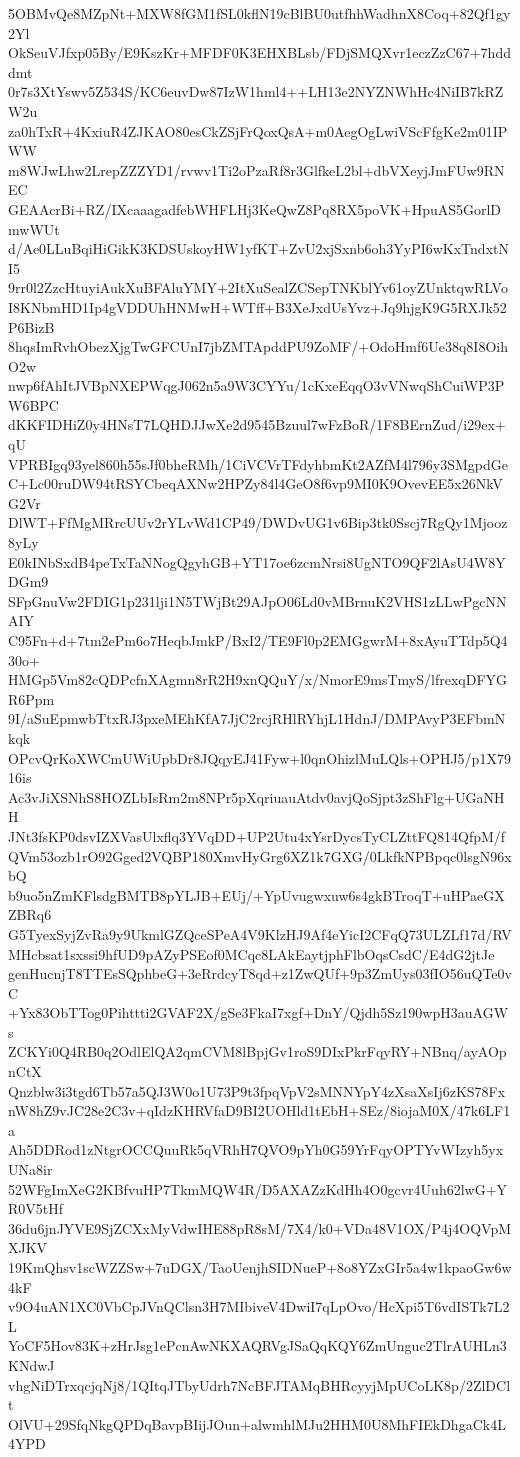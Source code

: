 5OBMvQe8MZpNt+MXW8fGM1fSL0kflN19cBlBU0utfhhWadhnX8Coq+82Qf1gy2Yl
OkSeuVJfxp05By/E9KszKr+MFDF0K3EHXBLsb/FDjSMQXvr1eczZzC67+7hdddmt
0r7s3XtYswv5Z534S/KC6euvDw87IzW1hml4++LH13e2NYZNWhHc4NiIB7kRZW2u
za0hTxR+4KxiuR4ZJKAO80esCkZSjFrQoxQsA+m0AegOgLwiVScFfgKe2m01IPWW
m8WJwLhw2LrepZZZYD1/rvwv1Ti2oPzaRf8r3GlfkeL2bl+dbVXeyjJmFUw9RNEC
GEAAcrBi+RZ/IXcaaagadfebWHFLHj3KeQwZ8Pq8RX5poVK+HpuAS5GorlDmwWUt
d/Ae0LLuBqiHiGikK3KDSUskoyHW1yfKT+ZvU2xjSxnb6oh3YyPI6wKxTndxtNI5
9rr0l2ZzcHtuyiAukXuBFAluYMY+2ItXuSealZCSepTNKblYv61oyZUnktqwRLVo
I8KNbmHD1Ip4gVDDUhHNMwH+WTff+B3XeJxdUsYvz+Jq9hjgK9G5RXJk52P6BizB
8hqsImRvhObezXjgTwGFCUnI7jbZMTApddPU9ZoMF/+OdoHmf6Ue38q8I8OihO2w
nwp6fAhItJVBpNXEPWqgJ062n5a9W3CYYu/1cKxeEqqO3vVNwqShCuiWP3PW6BPC
dKKFIDHiZ0y4HNsT7LQHDJJwXe2d9545Bzuul7wFzBoR/1F8BErnZud/i29ex+qU
VPRBIgq93yel860h55sJf0bheRMh/1CiVCVrTFdyhbmKt2AZfM4l796y3SMgpdGe
C+Lc00ruDW94tRSYCbeqAXNw2HPZy84l4GeO8f6vp9MI0K9OvevEE5x26NkVG2Vr
DlWT+FfMgMRrcUUv2rYLvWd1CP49/DWDvUG1v6Bip3tk0Sscj7RgQy1Mjooz8yLy
E0kINbSxdB4peTxTaNNogQgyhGB+YT17oe6zcmNrsi8UgNTO9QF2lAsU4W8YDGm9
SFpGnuVw2FDIG1p231lji1N5TWjBt29AJpO06Ld0vMBrnuK2VHS1zLLwPgcNNAIY
C95Fn+d+7tm2ePm6o7HeqbJmkP/BxI2/TE9Fl0p2EMGgwrM+8xAyuTTdp5Q430o+
HMGp5Vm82cQDPcfnXAgmn8rR2H9xnQQuY/x/NmorE9msTmyS/lfrexqDFYGR6Ppm
9I/aSuEpmwbTtxRJ3pxeMEhKfA7JjC2rcjRHlRYhjL1HdnJ/DMPAvyP3EFbmNkqk
OPcvQrKoXWCmUWiUpbDr8JQqyEJ41Fyw+l0qnOhizlMuLQls+OPHJ5/p1X7916is
Ac3vJiXSNhS8HOZLbIsRm2m8NPr5pXqriuauAtdv0avjQoSjpt3zShFlg+UGaNHH
JNt3fsKP0dsvIZXVasUlxflq3YVqDD+UP2Utu4xYsrDycsTyCLZttFQ814QfpM/f
QVm53ozb1rO92Gged2VQBP180XmvHyGrg6XZ1k7GXG/0LkfkNPBpqc0lsgN96xbQ
b9uo5nZmKFlsdgBMTB8pYLJB+EUj/+YpUvugwxuw6s4gkBTroqT+uHPaeGXZBRq6
G5TyexSyjZvRa9y9UkmlGZQceSPeA4V9KlzHJ9Af4eYicI2CFqQ73ULZLf17d/RV
MHcbsat1sxssi9hfUD9pAZyPSEof0MCqc8LAkEaytjphFlbOqsCsdC/E4dG2jtJe
genHucnjT8TTEsSQphbeG+3eRrdcyT8qd+z1ZwQUf+9p3ZmUys03fIO56uQTe0vC
+Yx83ObTTog0Pihttti2GVAF2X/gSe3FkaI7xgf+DnY/Qjdh5Sz190wpH3auAGWs
ZCKYi0Q4RB0q2OdlElQA2qmCVM8lBpjGv1roS9DIxPkrFqyRY+NBnq/ayAOpnCtX
Qnzblw3i3tgd6Tb57a5QJ3W0o1U73P9t3fpqVpV2sMNNYpY4zXsaXsIj6zKS78Fx
nW8hZ9vJC28e2C3v+qIdzKHRVfaD9BI2UOHld1tEbH+SEz/8iojaM0X/47k6LF1a
Ah5DDRod1zNtgrOCCQuuRk5qVRhH7QVO9pYh0G59YrFqyOPTYvWIzyh5yxUNa8ir
52WFgImXeG2KBfvuHP7TkmMQW4R/D5AXAZzKdHh4O0gcvr4Uuh62lwG+YR0V5tHf
36du6jnJYVE9SjZCXxMyVdwIHE88pR8sM/7X4/k0+VDa48V1OX/P4j4OQVpMXJKV
19KmQhsv1scWZZSw+7uDGX/TaoUenjhSIDNueP+8o8YZxGIr5a4w1kpaoGw6w4kF
v9O4uAN1XC0VbCpJVnQClsn3H7MIbiveV4DwiI7qLpOvo/HcXpi5T6vdISTk7L2L
YoCF5Hov83K+zHrJsg1ePcnAwNKXAQRVgJSaQqKQY6ZmUnguc2TlrAUHLn3KNdwJ
vhgNiDTrxqcjqNj8/1QItqJTbyUdrh7NcBFJTAMqBHRcyyjMpUCoLK8p/2ZlDClt
OlVU+29SfqNkgQPDqBavpBIijJOun+alwmhlMJu2HHM0U8MhFIEkDhgaCk4L4YPD
